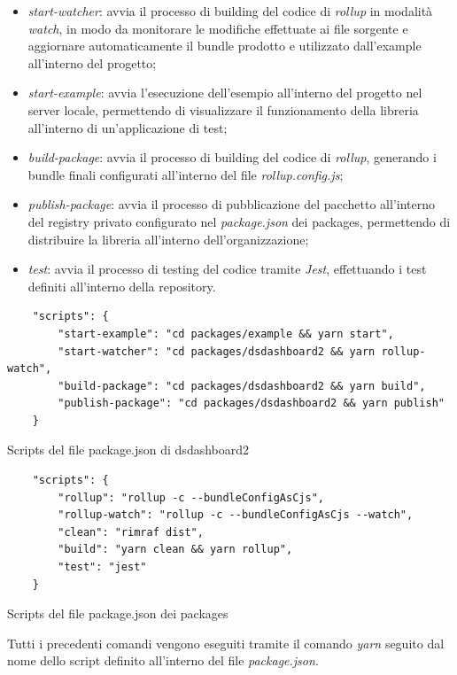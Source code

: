 \begin{itemize}
    \item \textit{start-watcher}: avvia il processo di building del codice di \textit{rollup} in modalità \textit{watch}, in modo da monitorare le modifiche effettuate
          ai file sorgente e aggiornare automaticamente il bundle prodotto e utilizzato dall'example all'interno del progetto;
    \item \textit{start-example}: avvia l'esecuzione dell'esempio all'interno del progetto nel server locale, permettendo di visualizzare il funzionamento della libreria
          all'interno di un'applicazione di test;
    \item \textit{build-package}: avvia il processo di building del codice di \textit{rollup}, generando i bundle finali configurati all'interno del file \textit{rollup.config.js};
    \item \textit{publish-package}: avvia il processo di pubblicazione del pacchetto all'interno del registry privato configurato nel \textit{package.json} dei packages, permettendo
          di distribuire la libreria all'interno dell'organizzazione;
    \item \textit{test}: avvia il processo di testing del codice tramite \textit{Jest}, effettuando i test definiti all'interno della repository.
\end{itemize}
\begin{listing}[H]
    \begin{verbatim}
    "scripts": {
        "start-example": "cd packages/example && yarn start",
        "start-watcher": "cd packages/dsdashboard2 && yarn rollup-watch",
        "build-package": "cd packages/dsdashboard2 && yarn build",
        "publish-package": "cd packages/dsdashboard2 && yarn publish"
    }
    \end{verbatim}
    \caption{Scripts del file package.json di dsdashboard2}
    \label{listing:scripts_package_json_dsdashboard2}
\end{listing}

\begin{listing}[H]
    \begin{verbatim}
    "scripts": {
        "rollup": "rollup -c --bundleConfigAsCjs",
        "rollup-watch": "rollup -c --bundleConfigAsCjs --watch",
        "clean": "rimraf dist",
        "build": "yarn clean && yarn rollup",
        "test": "jest"
    }
    \end{verbatim}
    \caption{Scripts del file package.json dei packages}
    \label{listing:scripts_package_json_packages}
\end{listing}
Tutti i precedenti comandi vengono eseguiti tramite il comando \textit{yarn} seguito dal nome dello script definito all'interno del file \textit{package.json}.


